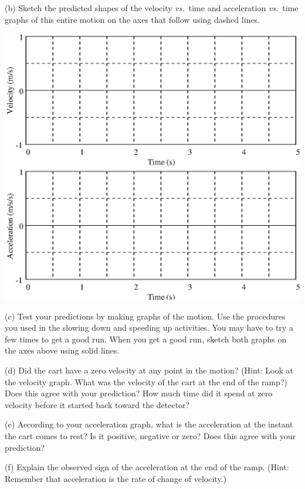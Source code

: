 (b) Sketch the predicted shapes of the velocity \textit{vs.}~time and acceleration 
\textit{vs.}~time graphs of this entire motion on the axes that follow using dashed lines.

\vspace{0.3cm}
{\par\centering \includegraphics{slowing/slowing_fig5.eps} \par}

(c) Test your predictions by making graphs of the motion. Use the procedures
you used in the slowing down and speeding up activities. You may have to try
a few times to get a good run. When you get a good run, sketch both graphs on the axes above using solid lines.

\pagebreak[2]
(d) Did the cart have a zero velocity at any point in the motion? (Hint: Look
at the velocity graph. What was the velocity of the cart at the end of the ramp?)
Does this agree with your prediction? How much time did it spend at zero velocity
before it started back toward the detector?
\answerspace{20mm}

(e) According to your acceleration graph, what is the acceleration at the instant
the cart comes to rest? Is it positive, negative or zero? Does this agree with
your prediction? 
\answerspace{20mm}

(f) Explain the observed sign of the acceleration at the end of the ramp. (Hint: Remember that acceleration is the rate of change of velocity.) 
\answerspace{20mm}

